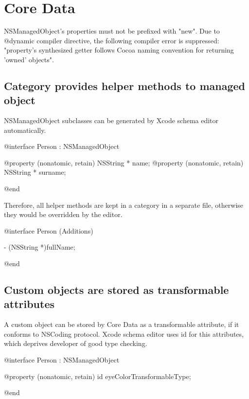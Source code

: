\documentclass[10pt]{extarticle}
\newenvironment{codelisting}
{\footnotesize\mdframed[middlelinewidth=0.5pt, middlelinecolor=BaliHaiColor, skipabove=15pt]\verbatim}
{\endverbatim\endmdframed\vspace{12pt}\normalsize}
\newenvironment{importantlisting}
{\mdframed[middlelinewidth=0.5pt, middlelinecolor=MatisseColor, skipabove=15pt]{\textbf{Important:}}}
{\endmdframed\vspace{12pt}}
\begin{document}
\section{Core Data}


\begin{importantlisting}
NSManagedObject's properties must not be prefixed with "new". Due to @dynamic compiler directive, the following compiler error is suppressed: "property's synthesized getter follows Cocoa naming convention for returning 'owned' objects".
\end{importantlisting}


\subsection{Category provides helper methods to managed object}

NSManagedObject subclasses can be generated by Xcode schema editor automatically.

\begin{codelisting}
@interface Person : NSManagedObject

@property (nonatomic, retain) NSString * name;
@property (nonatomic, retain) NSString * surname;

@end
\end{codelisting}

Therefore, all helper methods are kept in a category in a separate file, otherwise they would be overridden by the editor.

\begin{codelisting}
@interface Person (Additions)

- (NSString *)fullName;

@end
\end{codelisting}

\subsection{Custom objects are stored as transformable attributes}

A custom object can be stored by Core Data as a transformable attribute, if it conforms to NSCoding protocol. Xcode schema editor uses id for this attributes, which deprives developer of good type checking.

\begin{codelisting}
@interface Person : NSManagedObject

@property (nonatomic, retain) id eyeColorTransformableType;

@end
\end{codelisting}
\end{document}
